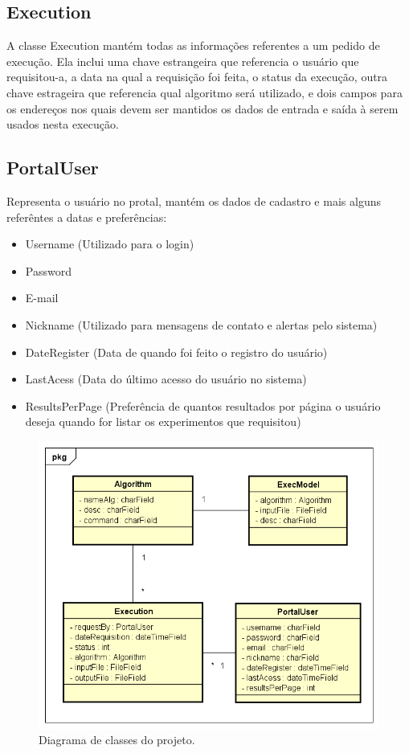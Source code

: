 \documentclass[tg]{mdtufsm}
\begin{document}
\subsection{Execution}
A classe Execution mantém todas as informações referentes a um pedido de execução. Ela inclui uma chave estrangeira que referencia o usuário que requisitou-a, a data na qual a requisição foi feita, o status da execução, outra chave estrageira que referencia qual algoritmo será utilizado, e dois campos para os endereços nos quais devem ser mantidos os dados de entrada e saída à serem usados nesta execução.

\subsection{PortalUser}
Representa o usuário no protal, mantém os dados de cadastro e mais alguns referêntes a datas e preferências:

\begin{itemize}
	\item Username (Utilizado para o login)
	\item Password 
	\item E-mail
	\item Nickname (Utilizado para mensagens de contato e alertas pelo sistema)
	\item DateRegister (Data de quando foi feito o registro do usuário)
	\item LastAcess (Data do último acesso do usuário no sistema)
	\item ResultsPerPage (Preferência de quantos resultados por página o usuário deseja quando for listar os experimentos que requisitou)
\end{itemize}

\begin{figure}
	\centering
	\includegraphics[width=1\textwidth]{class_diagran_tg}
	\caption{
		Diagrama de classes do projeto.
	}
	\label{fig:path_tracing}
\end{figure}
\end{document}
